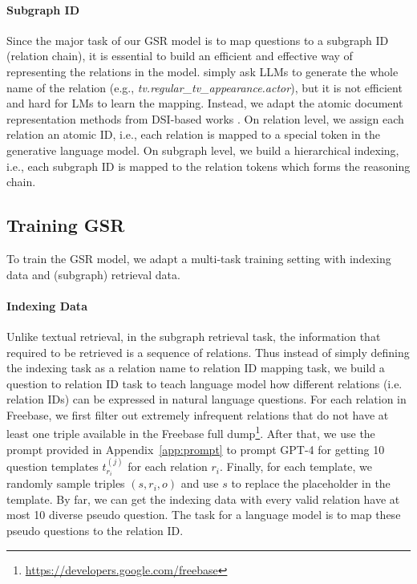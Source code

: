 \documentclass[11pt]{article}
\begin{document}
\paragraph{Subgraph ID}
Since the major task of our GSR model is to map questions to a subgraph ID (relation chain), it is essential to build an efficient and effective way of representing the relations in the model. \citet{luo2024reasoning} simply ask LLMs to generate the whole name of the relation (e.g., \textit{tv.regular\_tv\_appearance.actor}), but it is not efficient and hard for LMs to learn the mapping. Instead, we adapt the 
atomic document representation methods from DSI-based works \citep{DBLP:conf/nips/Tay00NBM000GSCM22}. On relation level, we assign each relation an atomic ID, i.e., each relation is mapped to a special token in the generative language model. On subgraph level, we build a hierarchical indexing, i.e., each subgraph ID is mapped to the relation tokens which forms the reasoning chain. 

\subsection{Training GSR}

\label{sec:train}
To train the GSR model, we adapt a multi-task training setting with indexing data and (subgraph) retrieval data.
\paragraph{Indexing Data}
Unlike textual retrieval, in the subgraph retrieval task, the information that required to be retrieved is a sequence of relations. Thus instead of simply defining the indexing task as a relation name to relation ID mapping task, we build a question to relation ID task to teach language model how different relations (i.e. relation IDs) can be expressed in natural language questions. For each relation in Freebase, we first filter out extremely infrequent relations that do not have at least one triple available in the Freebase full dump\footnote{\url{https://developers.google.com/freebase}}. After that, we use the prompt provided in Appendix~\ref{app:prompt} to prompt GPT-4 for getting 10 question templates $t_{r_i}^{(j)}$ for each relation $r_i$. Finally, for each template, we randomly sample triples $(s, r_i, o)$ and use $s$ to replace the placeholder in the template. By far, we can get the indexing data with every valid relation have at most 10 diverse pseudo question. The task for a language model is to map these pseudo questions to the relation ID.
\end{document}
